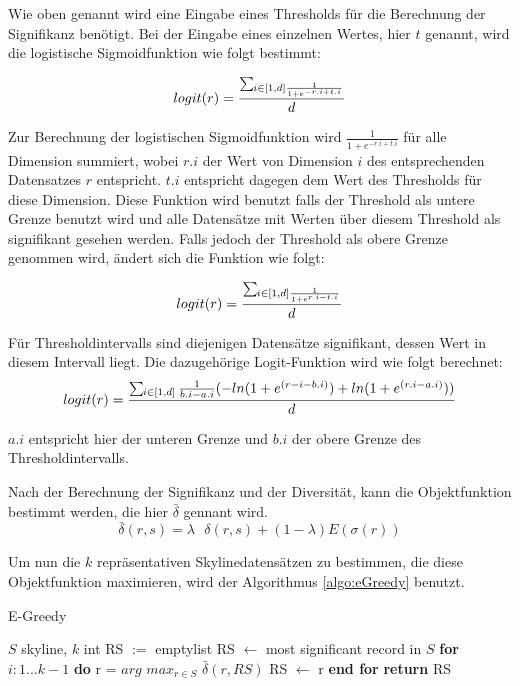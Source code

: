 Wie oben genannt wird eine Eingabe eines Thresholds für die Berechnung der Signifikanz benötigt. Bei der Eingabe eines einzelnen Wertes, hier $t$ genannt, wird die logistische Sigmoidfunktion wie folgt bestimmt:

$$logit(r)=\frac{\sum\mathop{}_{\mkern-5mu i \in{[1,d]}\frac{1}{1+e^{-r.i+t.i}}}}{d}$$

Zur Berechnung der logistischen Sigmoidfunktion  wird $\frac{1}{1+e^{-r.i+t.i}}$ für alle Dimension summiert, wobei $r.i$ der Wert von Dimension $i$ des entsprechenden Datensatzes $r$ entspricht. $t.i$ entspricht dagegen dem Wert des Thresholds für diese Dimension. Diese Funktion wird benutzt falls der Threshold als untere Grenze benutzt wird und alle Datensätze mit Werten über diesem Threshold als signifikant gesehen werden.
Falls jedoch der Threshold als obere Grenze genommen wird, ändert sich die Funktion wie folgt:

$$logit(r)=\frac{\sum\mathop{}_{\mkern-5mu i \in{[1,d]}\frac{1}{1+e^{r.i-t.i}}}}{d}$$

Für Thresholdintervalls sind diejenigen Datensätze signifikant, dessen Wert in diesem Intervall liegt. Die dazugehörige Logit-Funktion wird wie folgt berechnet:
$$logit(r)=\frac{\sum\limits\mathop{}_{\mkern-5mu i \in{[1,d]}}\frac{1}{b.i-a.i}(-ln(1+e^{(r-i-b.i)})+ln(1+e^{(r.i-a.i)}))}{d}$$

$a.i$ entspricht hier der unteren Grenze und $b.i$ der obere Grenze des Thresholdintervalls. 


Nach der Berechnung der Signifikanz und der Diversität, kann die Objektfunktion bestimmt werden, die hier $\bar{\delta}$ gennant wird.
$$\bar{\delta}(r,s)= \lambda \text{ } \delta(r,s)+(1- \lambda)E(\sigma(r))$$

Um nun die $k$ repräsentativen Skylinedatensätzen zu bestimmen, die diese Objektfunktion maximieren, wird der Algorithmus \ref{algo:eGreedy} benutzt. 


\begin{algorithm}[H]
\caption{E-Greedy}\label{algo:eGreedy}
\begin{algorithmic}[1]
\INPUTBF $S$ skyline, $k$ int
\State RS $:=$ emptylist
\State RS $\leftarrow$ most significant record in $S$
\State \textbf{for} $i: 1\ldots k-1$ \textbf{do}
\State \hspace{\algorithmicindent}r = $arg$ $max_{r\in{S}}$ $\bar{\delta}(r,RS)$
\State \hspace{\algorithmicindent} RS $\leftarrow$ r
\State \textbf{end for}
\State \textbf{return} RS
\end{algorithmic}
\end{algorithm}

